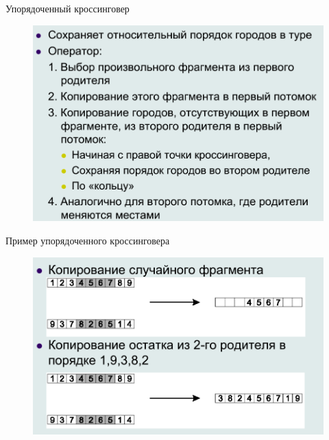 \documentclass{beamer}
\begin{document}
\begin{frame}{Упорядоченный кроссинговер}
\begin{figure}[h]
\centering
\includegraphics[scale=0.4]{images/lec04-pic41.png}
\end{figure}
\end{frame}

\begin{frame}{Пример упорядоченного кроссинговера}
\begin{figure}[h]
\centering
\includegraphics[scale=0.4]{images/lec04-pic42.png}
\end{figure}
\end{frame}
\end{document}
